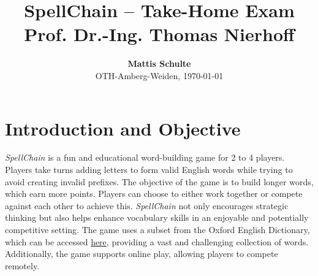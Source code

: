\documentclass{article}
\begin{document}
\title{\textbf{SpellChain -- Take-Home Exam}\\ \vspace{0.2cm}\large \textbf{Prof. Dr.-Ing. Thomas Nierhoff}}
\author{\normalsize\textbf{Mattis Schulte}\\ {\small OTH-Amberg-Weiden, \today}}\date{}
\maketitle

\section*{Introduction and Objective}
\textit{SpellChain} is a fun and educational word-building game for 2 to 4 players. Players take turns adding letters to form valid English words while trying to avoid creating invalid prefixes. The objective of the game is to build longer words, which earn more points. Players can choose to either work together or compete against each other to achieve this. \textit{SpellChain} not only encourages strategic thinking but also helps enhance vocabulary skills in an enjoyable and potentially competitive setting. The game uses a subset from the Oxford English Dictionary, which can be accessed \href{https://raw.githubusercontent.com/sujithps/Dictionary/master/Oxford%20English%20Dictionary.txt}{\textcolor{links}{here}}, providing a vast and challenging collection of words. Additionally, the game supports online play, allowing players to compete remotely.
\end{document}
